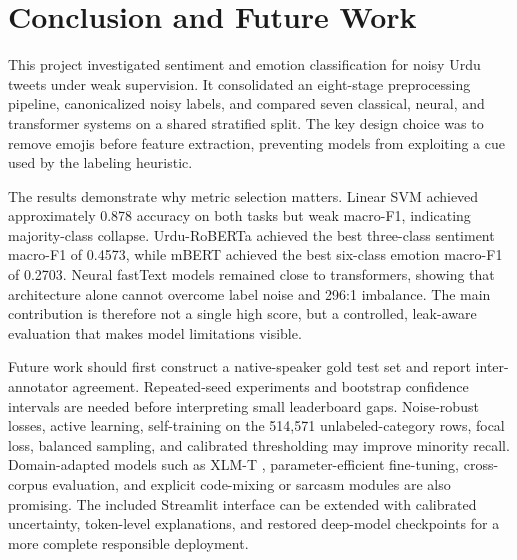 \documentclass[conference]{IEEEtran}
\begin{document}
\section{Conclusion and Future Work}

This project investigated sentiment and emotion classification for noisy Urdu tweets under weak supervision. It consolidated an eight-stage preprocessing pipeline, canonicalized noisy labels, and compared seven classical, neural, and transformer systems on a shared stratified split. The key design choice was to remove emojis before feature extraction, preventing models from exploiting a cue used by the labeling heuristic.

The results demonstrate why metric selection matters. Linear SVM achieved approximately 0.878 accuracy on both tasks but weak macro-F1, indicating majority-class collapse. Urdu-RoBERTa achieved the best three-class sentiment macro-F1 of 0.4573, while mBERT achieved the best six-class emotion macro-F1 of 0.2703. Neural fastText models remained close to transformers, showing that architecture alone cannot overcome label noise and 296:1 imbalance. The main contribution is therefore not a single high score, but a controlled, leak-aware evaluation that makes model limitations visible.

Future work should first construct a native-speaker gold test set and report inter-annotator agreement. Repeated-seed experiments and bootstrap confidence intervals are needed before interpreting small leaderboard gaps. Noise-robust losses, active learning, self-training on the 514,571 unlabeled-category rows, focal loss, balanced sampling, and calibrated thresholding may improve minority recall. Domain-adapted models such as XLM-T \cite{barbieri2022xlmt}, parameter-efficient fine-tuning, cross-corpus evaluation, and explicit code-mixing or sarcasm modules are also promising. The included Streamlit interface can be extended with calibrated uncertainty, token-level explanations, and restored deep-model checkpoints for a more complete responsible deployment.



\end{document}
